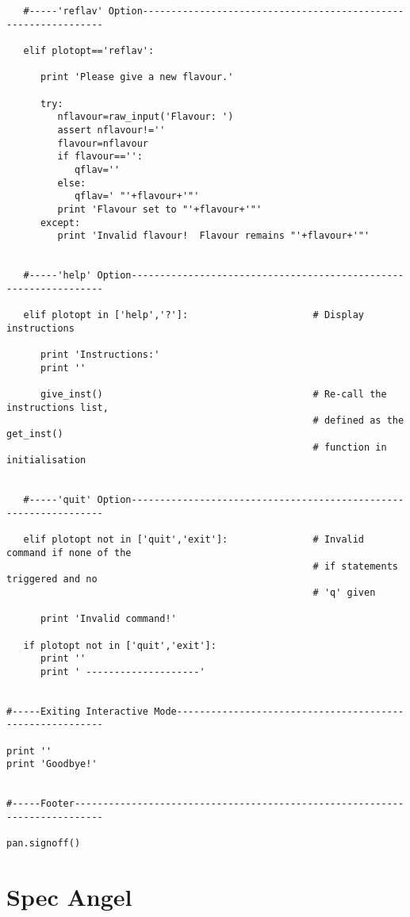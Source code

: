 \begin{verbatim}
   #-----'reflav' Option---------------------------------------------------------------

   elif plotopt=='reflav':

      print 'Please give a new flavour.'

      try:
         nflavour=raw_input('Flavour: ')
         assert nflavour!=''
         flavour=nflavour
         if flavour=='':
            qflav=''
         else:
            qflav=' "'+flavour+'"'
         print 'Flavour set to "'+flavour+'"'
      except:
         print 'Invalid flavour!  Flavour remains "'+flavour+'"'


   #-----'help' Option-----------------------------------------------------------------

   elif plotopt in ['help','?']:                      # Display instructions

      print 'Instructions:'
      print ''

      give_inst()                                     # Re-call the instructions list,
                                                      # defined as the get_inst()
                                                      # function in initialisation


   #-----'quit' Option-----------------------------------------------------------------
   
   elif plotopt not in ['quit','exit']:               # Invalid command if none of the
                                                      # if statements triggered and no
                                                      # 'q' given

      print 'Invalid command!'

   if plotopt not in ['quit','exit']:
      print ''
      print ' --------------------'


#-----Exiting Interactive Mode---------------------------------------------------------

print ''
print 'Goodbye!'                                           


#-----Footer---------------------------------------------------------------------------

pan.signoff()

\end{verbatim}

\section{Spec Angel}

